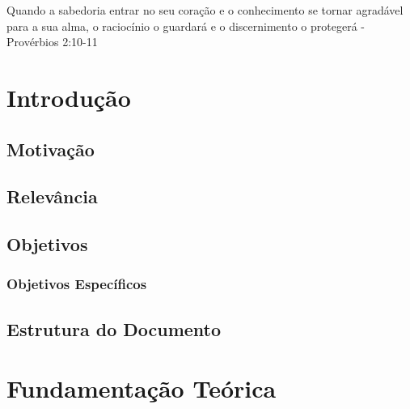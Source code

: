 \documentclass[openright]{normas-utf-tex} %
\begin{document}
\begin{epigrafe}
Quando a sabedoria entrar no seu coração e o conhecimento se tornar agradável para a sua alma, o raciocínio o guardará e o discernimento o protegerá - Provérbios 2:10-11
\end{epigrafe}

\begin{resumo}

\end{resumo}

\begin{abstract}

\end{abstract}

\listadefiguras %
\listadetabelas %

\sumario %

\setcounter{page}{12}
\chapter{Introdução}
	
	\section{Motivação}	\label{motivation}
		
	\section{Relevância} \label{relevance}
		
	\section{Objetivos} \label{goals}
		
		\subsection{Objetivos Específicos}
			
	\section{Estrutura do Documento}
		
\chapter{Fundamentação Teórica}
\label{chap:fundteoric}
	
\end{document}
